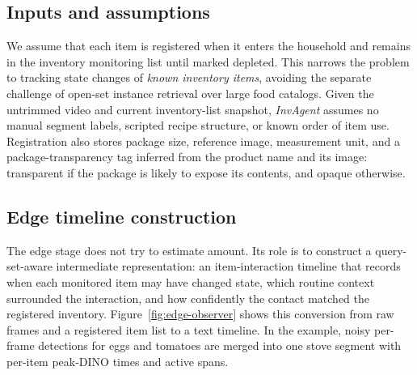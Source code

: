 \documentclass[sigconf,anonymous,nonacm]{acmart}
\newcommand{\sys}{\textit{InvAgent}\xspace}
\begin{document}
\subsection{Inputs and assumptions}
\label{sec:system-inputs}

We assume that each item is registered when it enters the household and
remains in the inventory monitoring list until marked depleted. This
narrows the problem to tracking state changes of \textit{known
inventory items}, avoiding the separate challenge of open-set instance
retrieval over large food catalogs. Given the untrimmed video and
current inventory-list snapshot, \sys assumes no manual segment
labels, scripted recipe structure, or known order of item use.
Registration also stores package size, reference image, measurement
unit, and a package-transparency tag inferred from the product name and its
image: transparent if the package is likely to expose its contents, and
opaque otherwise.

\subsection{Edge timeline construction}

The edge stage does not try to estimate amount. Its role is to construct
a query-set-aware intermediate representation: an item-interaction
timeline that records when each monitored item may have changed state,
which routine context surrounded the interaction, and how confidently
the contact matched the registered inventory. Figure~\ref{fig:edge-observer}
shows this conversion from raw frames and a registered item list to
a text timeline. In the example, noisy per-frame detections for eggs and
tomatoes are merged into one stove segment with per-item peak-DINO times
and active spans.
\end{document}
